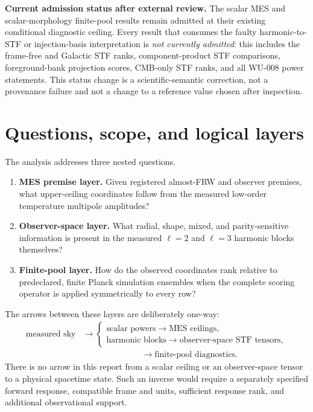 \documentclass[11pt,a4paper]{article}
\newenvironment{warningbox}
  {\begin{center}\begin{minipage}{0.95\linewidth}\raggedright\color{warningbrown}}
  {\end{minipage}\end{center}}
\begin{document}
\begin{warningbox}
\textbf{Current admission status after external review.}
The scalar MES and scalar-morphology finite-pool results remain admitted at
their existing conditional diagnostic ceiling.  Every result that consumes
the faulty harmonic-to-STF or injection-basis interpretation is
\emph{not currently admitted}: this includes the frame-free and Galactic STF
ranks, component-product STF comparisons, foreground-bank projection scores,
CMB-only STF ranks, and all WU-008 power statements.  This status change is a
scientific-semantic correction, not a provenance failure and not a change to a
reference value chosen after inspection.
\end{warningbox}

\begingroup
\setlength{\parskip}{0pt}
\tableofcontents
\endgroup
\clearpage

\section{Questions, scope, and logical layers}

The analysis addresses three nested questions.

\begin{enumerate}[leftmargin=*,itemsep=0.3em]
  \item \textbf{MES premise layer.}  Given registered almost-FRW and observer
  premises, what upper-ceiling coordinates follow from the measured low-order
  temperature multipole amplitudes?
  \item \textbf{Observer-space layer.}  What radial, shape, mixed, and
  parity-sensitive information is present in the measured $\ell=2$ and
  $\ell=3$ harmonic blocks themselves?
  \item \textbf{Finite-pool layer.}  How do the observed coordinates rank
  relative to predeclared, finite Planck simulation ensembles when the complete
  scoring operator is applied symmetrically to every row?
\end{enumerate}

The arrows between these layers are deliberately one-way:
\begin{align*}
\text{measured sky}&\longrightarrow
\begin{cases}
  \text{scalar powers}\longrightarrow\text{MES ceilings},\\
  \text{harmonic blocks}\longrightarrow\text{observer-space STF tensors},
\end{cases}\\[-0.2em]
&\hspace{7em}\longrightarrow\text{finite-pool diagnostics}.
\end{align*}
There is no arrow in this report from a scalar ceiling or an observer-space
tensor to a physical spacetime state.  Such an inverse would require a separately
specified forward response, compatible frame and units, sufficient response
rank, and additional observational support.
\end{document}
